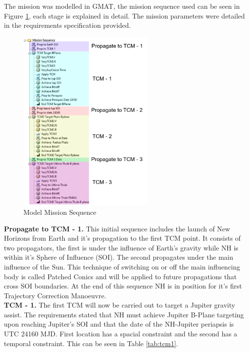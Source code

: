 \documentclass[11pt]{article}
\begin{document}
The mission was modelled in GMAT, the mission sequence used can be seen in Figure \ref{fig:sequence}, each stage is explained in detail. The mission parameters were detailed in the requirements specification provided.
\begin{figure}[H]
    \centering
    \includegraphics[width=0.6\textwidth]{Mission.PNG}
    \caption{Model Mission Sequence}
    \label{fig:sequence}
\end{figure}


\textbf{Propagate to TCM - 1.} This initial sequence includes the launch of New Horizons from Earth and it's propagation to the first TCM point. It consists of two propagators, the first is under the influence of Earth's gravity while NH is within it's Sphere of Influence (SOI). The second propagates under the main influence of the Sun. This technique of switching on or off the main influencing body is called Patched Conics and will be applied to future propagations that cross SOI boundaries. At the end of this sequence NH is in position for it's first Trajectory Correction Manoeuvre.\\

\textbf{TCM - 1.} The first TCM will now be carried out to target a Jupiter gravity assist. The requirements stated that NH must achieve Jupiter B-Plane targeting upon reaching Jupiter's SOI and that the date of the NH-Jupiter periapsis is UTC 24160 MJD. First location has a spacial constraint and the second has a temporal constraint. This can be seen in Table \ref{tab:tcm1}.
\end{document}
